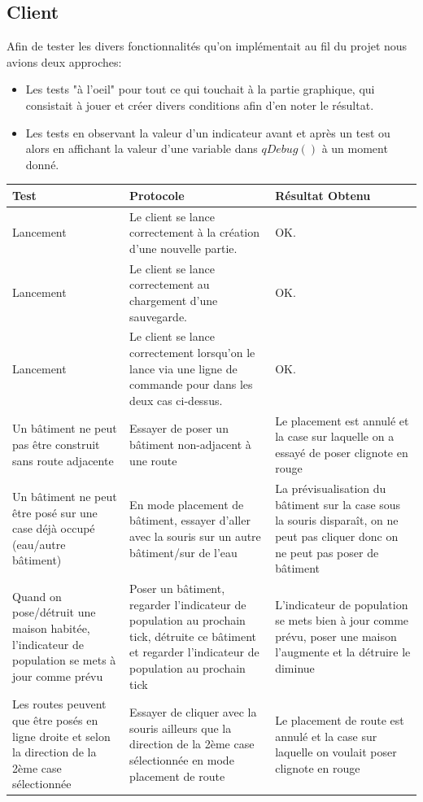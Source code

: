 \documentclass[a4paper,10pt,openany,oneside]{report}
\begin{document}
\subsection{Client}
Afin de tester les divers fonctionnalités qu'on implémentait au fil du projet nous avions deux approches:
\begin{itemize}
\item Les tests "à l'oeil" pour tout ce qui touchait à la partie graphique, qui consistait à jouer et créer divers conditions afin d'en noter le résultat.
\
\item Les tests en observant la  valeur d'un indicateur avant et après un test ou alors en affichant la valeur d'une variable dans $qDebug()$ à un moment donné.

\end{itemize}
\begin{center}
	\begin{longtable}{| p{} | p{} | p{} |}
	\hline
		 \textbf{Test} & \textbf{Protocole} & \textbf{Résultat Obtenu}
\\ \hline Lancement & Le client se lance correctement à la création d'une nouvelle partie. & OK.
\\ \hline Lancement & Le client se lance correctement au chargement d'une sauvegarde. & OK.
\\ \hline Lancement & Le client se lance correctement lorsqu'on le lance via une ligne de commande pour dans les deux cas ci-dessus. & OK.
		 \\ \hline Un bâtiment ne peut pas être construit sans route adjacente & Essayer de poser un bâtiment non-adjacent à une route & Le placement est annulé et la case sur laquelle on a essayé de poser clignote en rouge
		\\ \hline Un bâtiment ne peut être posé sur une case déjà occupé (eau/autre bâtiment) & En mode placement de bâtiment, essayer d'aller avec la souris sur un autre bâtiment/sur de l'eau & La prévisualisation du bâtiment sur la case sous la souris disparaît, on ne peut pas cliquer donc on ne peut pas poser de bâtiment
		\\ \hline Quand on pose/détruit une maison habitée, l'indicateur de population se mets à jour comme prévu & Poser un bâtiment, regarder l'indicateur de population au prochain tick, détruite ce bâtiment et regarder l'indicateur de population au prochain tick & L'indicateur de population se mets bien à jour comme prévu, poser une maison l'augmente et la détruire le diminue
		\\ \hline Les routes peuvent que être posés en ligne droite et selon la direction de la 2ème case sélectionnée & Essayer de cliquer avec la souris ailleurs que la direction de la 2ème case sélectionnée en mode placement de route & Le placement de route est annulé et la case sur laquelle on voulait poser clignote en rouge

\end{longtable}
\end{center}
\end{document}
